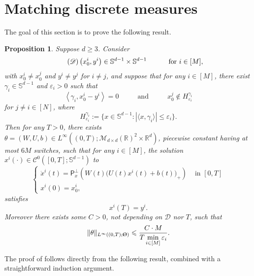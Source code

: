 \documentclass[a4paper,11pt]{article}
\theoremstyle{plain}
\newtheorem{proposition}[theorem]{Proposition}
\newcommand{\R}{\mathbb{R}}
\newcommand{\proj}{\bm{\mathsf{P}}^\perp}
\renewcommand{\S}{\mathbb{S}^{d-1}}
\newcommand{\bW}{\bm{\mathit{W}}}
\newcommand{\bU}{\bm{\mathit{U}}}
\renewcommand{\leq}{\leqslant}
\renewcommand{\geq}{\geqslant}
\numberwithin{equation}{section}
\begin{document}
 


\section{Matching discrete measures} \label{sec: neural.ode}

The goal of this section is to prove the following result.

\begin{proposition} \label{prop: interpolation.neural.ode}
Suppose $d\geq3$. Consider 
\begin{equation*} \tag{$\mathscr{D}$}
  \left(x_0^i,y^i\right)\in\S\times\S \hspace{1cm} \text{ for } i\in[M], 
\end{equation*}
with $x_0^i\neq x_0^j$ and $y^i\neq y^j$ for $i\neq j$, and suppose that for any $i\in[M]$, there exist $\gamma_i\in\S$ and $\varepsilon_i>0$ such that
\begin{equation*} 
\left\langle\gamma_i,x_0^i-y^i\right\rangle=0 \hspace{1cm} \text{ and } \hspace{1cm} 
x_0^j\notin H_{\varepsilon_i}^{\gamma_i}
\end{equation*}
for $j\neq i\in[N]$, where
\begin{equation*}
H_{\varepsilon_i}^{\gamma_i}:=\Big\{x\in \S\colon|\langle x,\gamma_i\rangle|\leq \varepsilon_i\Big\}.
\end{equation*}
Then for any $T>0$, there exists $\theta=(\bW,\bU,b)\in L^\infty((0,T);\mathscr{M}_{d\times d}(\R)^2\times\R^d)$, piecewise constant having at most $6M$ switches, such that for any $i\in[M]$, the solution $x^i(\cdot)\in \mathscr{C}^0([0,T];\S)$ to
\begin{equation} \label{eq: neural.ode.sphere}
\begin{cases}
\dot{x}^i(t)=\proj_x\left(\bW(t)\Big(\bU(t)x^i(t)+b(t)\Big)_+\right) &\text{ in } [0, T]\\
x^i(0)=x_0^i,
\end{cases}
\end{equation}
satisfies 
$$x^i(T)=y^i.$$
Moreover there exists some $C>0$, not depending on $\mathscr{D}$ nor $T$, such that
\begin{equation*}
\|\theta\|_{L^\infty((0,T);\Uptheta)}\leq \frac{C\cdot M}{\displaystyle T\min_{i\in[M]}\varepsilon_{i}}.
\end{equation*}
\end{proposition}


The proof of  follows directly from the following result, combined with a straightforward induction argument. 
\end{document}
